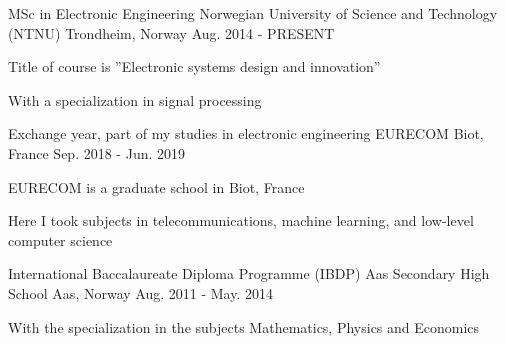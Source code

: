 \begin{cventries}
  \cventry
    {MSc in Electronic Engineering}
    {Norwegian University of Science and Technology (NTNU)}
    {Trondheim, Norway}
    {Aug. 2014 - PRESENT}
    {
      \begin{cvitems}
        \item {Title of course is ''Electronic systems design and innovation''}
        \item {With a specialization in signal processing}
      \end{cvitems}
    }
  \cventry
    {Exchange year, part of my studies in electronic engineering}
    {EURECOM}
    {Biot, France}
    {Sep. 2018 - Jun. 2019}
    {
      \begin{cvitems}
        \item {EURECOM is a graduate school in Biot, France}
        \item {Here I took subjects in telecommunications, machine learning, and low-level computer science}
      \end{cvitems}
    }
  \cventry
    {International Baccalaureate Diploma Programme (IBDP)}
    {Aas Secondary High School}
    {Aas, Norway}
    {Aug. 2011 - May. 2014}
    {
      \begin{cvitems}
        \item {With the specialization in the subjects Mathematics, Physics and Economics}
      \end{cvitems}
    }
\end{cventries}
